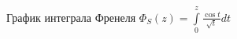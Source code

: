 \documentclass{article}
\begin{document}
\begin{figure}[H]
\centering
\begin{minipage}[t]{.4\textwidth}
\begin{figure}[H]
  \centering
  \caption{График интеграла Френеля $\Phi_{S}(z) = \int\limits_0^{z} \frac{\cos{t}}{\sqrt{t}} dt$}
  \label{fig:fren2_int}
  \end{figure}%
\end{minipage}\hspace{10pt}%
\begin{minipage}[t]{.4\textwidth}%
\begin{figure}[H]
  \centering

\end{figure}
\end{minipage}
\end{figure}
\end{document}
